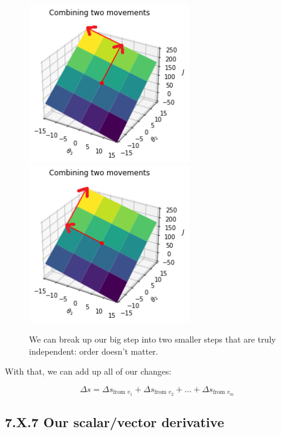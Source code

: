         \begin{figure}[H]
            \includegraphics[width=70mm,scale=0.5]{images/gradient_descent_images/thetaboth_movement_plane.png}
            \includegraphics[width=70mm,scale=0.5]{images/gradient_descent_images/thetaboth_movement_plane_reversed.png}
                
            \caption*{We can break up our big step into two smaller steps that are truly independent: order doesn't matter.}
        \end{figure}
        
        
        
        With that, we can add up all of our changes:
        
        \begin{equation}
            \Delta s = 
            \Delta s_{\text{from } v_1}
            +
            \Delta s_{\text{from } v_2}
            +
            \dots
            +
            \Delta s_{\text{from } v_m}
        \end{equation}
    
    \secdiv
    
    \subsection*{7.X.7 \quad Our scalar/vector derivative}
        
